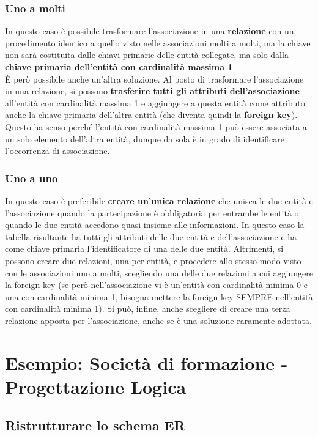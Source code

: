 \documentclass[11pt, a4paper, titlepage, oneside]{scrbook}
\begin{document}
\subsubsection*{Uno a molti}

In questo caso è possibile trasformare l'associazione in una \textbf{relazione} con un procedimento identico a quello visto nelle associazioni molti a molti, ma la chiave non sarà costituita dalle chiavi primarie delle entità collegate, ma solo dalla \textbf{chiave primaria dell'entità con cardinalità massima 1}. \\
È però possibile anche un'altra soluzione. Al posto di trasformare l'associazione in una relazione, si possono \textbf{trasferire tutti gli attributi dell'associazione} all'entità con cardinalità massima 1 e aggiungere a questa entità come attributo anche la chiave primaria dell'altra entità (che diventa quindi la \textbf{foreign key}). Questo ha senso perché l'entità con cardinalità massima 1 può essere associata a un solo elemento dell'altra entità, dunque da sola è in grado di identificare l'occorrenza di associazione.

\subsubsection*{Uno a uno}

In questo caso è preferibile \textbf{creare un'unica relazione} che unisca le due entità e l'associazione quando la partecipazione è obbligatoria per entrambe le entità o quando le due entità accedono quasi insieme alle informazioni. In questo caso la tabella risultante ha tutti gli attributi delle due entità e dell'associazione e ha come chiave primaria l'identificatore di una delle due entità. Altrimenti, si possono creare due relazioni, una per entità, e procedere allo stesso modo visto con le associazioni uno a molti, scegliendo una delle due relazioni a cui aggiungere la foreign key (se però nell'associazione vi è un'entità con cardinalità minima 0 e una con cardinalità minima 1, bisogna mettere la foreign key SEMPRE nell'entità con cardinalità minima 1). Si può, infine, anche scegliere di creare una terza relazione apposta per l'associazione, anche se è una soluzione raramente adottata.

\section{Esempio: Società di formazione - Progettazione Logica}
\subsection{Ristrutturare lo schema ER}
\end{document}
